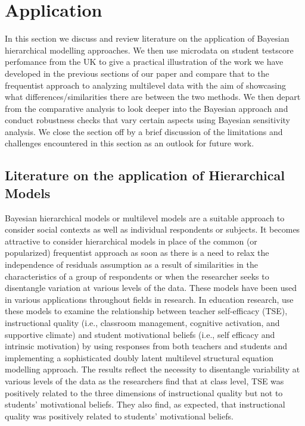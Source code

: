 \section{Application}
\label{sec:application}

In this section we discuss and review literature on the application of Bayesian hierarchical modelling approaches. We then use microdata on student testscore perfomance from the UK to give a practical illustration of the work we have developed in the previous sections of our paper and compare that to the frequentist approach to analyzing multilevel data with the aim of showcasing what differences/similarities there are between the two methods. We then depart from the comparative analysis to look deeper into the Bayesian approach and conduct robustness checks that vary certain aspects using Bayesian sensitivity analysis. We close the section off by a brief discussion of the limitations and challenges encountered in this section as an outlook for future work.


\subsection{Literature on the application of Hierarchical Models}

Bayesian hierarchical models or multilevel models are a suitable approach to consider social contexts as well as individual respondents or subjects. It becomes attractive to consider hierarchical models in place of the common (or popularized) frequentist approach as soon as there is a need to relax the independence of residuals assumption as a result of similarities in the characteristics of a group of respondents or when the researcher seeks to disentangle variation at various levels of the data. These models have been used in various applications throughout fields in research. In education research, \cite{buric2020teacher} use these models to examine the relationship between teacher self-efficacy (TSE), instructional quality (i.e., classroom management, cognitive activation, and supportive climate) and student motivational beliefs (i.e., self efficacy and intrinsic motivation) by using responses from both teachers and students and implementing a sophisticated doubly latent multilevel structural equation modelling approach. The results reflect the necessity to disentangle variability at various levels of the data as the researchers find that at class level, TSE was positively related to the three dimensions of instructional quality but not to students' motivational beliefs. They also find, as expected, that instructional quality was positively related to students’ motivational beliefs.


